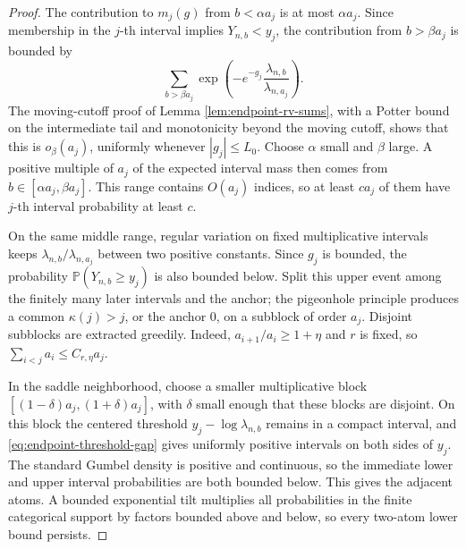 \documentclass[11pt]{article}
\theoremstyle{remark}
\newcommand{\Pp}{\mathbb P}
\begin{document}
\begin{proof}
The contribution to \(m_j(g)\) from \(b<\alpha a_j\) is at most
\(\alpha a_j\).  Since membership in the \(j\)-th interval implies
\(Y_{n,b}<y_j\), the contribution from \(b>\beta a_j\) is bounded by
\[
        \sum_{b>\beta a_j}
        \exp\left(-e^{-g_j}
        \frac{\lambda_{n,b}}{\lambda_{n,a_j}}\right).
\]
The moving-cutoff proof of Lemma \ref{lem:endpoint-rv-sums}, with a Potter
bound on the intermediate tail and monotonicity beyond the moving cutoff,
shows that this is \(o_\beta(a_j)\), uniformly whenever \(|g_j|\le L_0\).  Choose \(\alpha\)
small and \(\beta\) large.  A positive multiple of \(a_j\) of the expected
interval mass then comes from \(b\in[\alpha a_j,\beta a_j]\).  This range
contains \(O(a_j)\) indices, so at least \(ca_j\) of them have
\(j\)-th interval probability at least \(c\).

On the same middle range, regular variation on fixed multiplicative intervals
keeps \(\lambda_{n,b}/\lambda_{n,a_j}\) between two positive constants.
Since \(g_j\) is bounded, the probability
\(\Pp(Y_{n,b}\ge y_j)\) is also bounded below.  Split this upper event among
the finitely many later intervals and the anchor; the pigeonhole principle
produces a common \(\kappa(j)>j\), or the anchor \(0\), on a subblock of order
\(a_j\).  Disjoint subblocks are extracted greedily.  Indeed,
\(a_{i+1}/a_i\ge1+\eta\) and \(r\) is fixed, so
\(\sum_{i<j}a_i\le C_{r,\eta}a_j\).

In the saddle neighborhood, choose a smaller multiplicative block
\([(1-\delta)a_j,(1+\delta)a_j]\), with \(\delta\) small enough that these
blocks are disjoint.  On this block the centered threshold
\(y_j-\log\lambda_{n,b}\) remains in a compact interval, and
\eqref{eq:endpoint-threshold-gap} gives uniformly positive intervals on both
sides of \(y_j\).  The standard Gumbel density is positive and continuous, so
the immediate lower and upper interval probabilities are both bounded below.
This gives the adjacent atoms.  A bounded exponential tilt multiplies all
probabilities in the finite categorical support by factors bounded above and
below, so every two-atom lower bound persists.
\end{proof}
\end{document}
